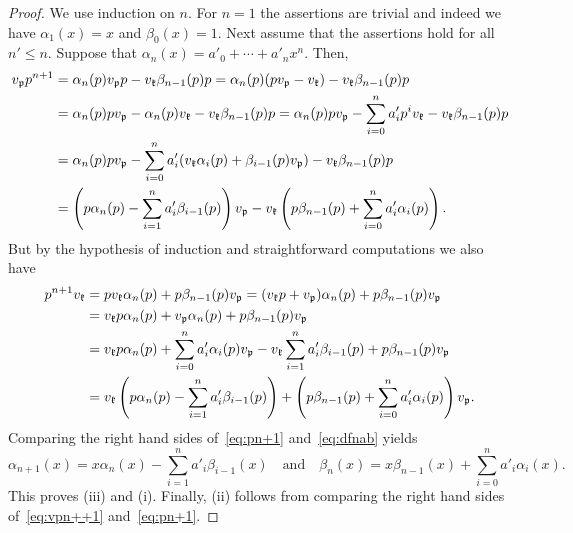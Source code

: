 \documentclass[11pt]{amsart}
\begin{document}
\begin{proof}
We use induction on $n$. For $n=1$ the assertions are  trivial and indeed we have $\alpha_1(x)=x$ and $\beta_0(x)=1$. Next assume that the assertions hold for all $n'\leq n$. Suppose that $\alpha_n(x)=a'_0+\cdots+a'_n x^n$. Then,
\begin{align}
\label{eq:vpn++1}
\notag
v_{\mathfrak p}p^{n+1}
&=
\alpha_{n}(p)v_{\mathfrak p}p-v_{\mathfrak k}\beta_{n-1}(p)p
=
\alpha_{n}(p)(pv_{\mathfrak p}-v_{\mathfrak k})-v_{\mathfrak k}\beta_{n-1}(p)p\\
\notag
&
=\alpha_{n}(p)pv_{\mathfrak p}-\alpha_{n}(p)v_{\mathfrak k}-v_{\mathfrak k}\beta_{n-1}(p)p
=
\alpha_{n}(p)pv_{\mathfrak p}-\sum_{i=0}^{n}a'_ip^i v_{\mathfrak k}-v_{\mathfrak k}\beta_{n-1}(p)p
\\
\notag 
&
=\alpha_{n}(p)pv_{\mathfrak p}-\sum_{i=0}^{n}a'_i(v_{\mathfrak k}\alpha_{i}(p)+\beta_{i-1}(p)v_{\mathfrak p}
)-v_{\mathfrak k}\beta_{n-1}(p)p\\
&=\left(p\alpha_n(p)-\sum_{i=1}^{n}a'_i\beta_{i-1}(p)\right)v_{\mathfrak p}-v_{\mathfrak k}\left(p\beta_{n-1}(p)+\sum_{i=0}^na'_i\alpha_{i}(p)\right).
\end{align}
But by the hypothesis of induction and straightforward computations we also have 
\begin{align}
\label{eq:pn+1}
\notag
p^{n+1}v_{\mathfrak k}
&=
pv_{\mathfrak k}\alpha_{n}(p)+p\beta_{n-1}(p)v_{\mathfrak p}
=
(v_{\mathfrak k}p+v_{\mathfrak p})\alpha_{n}(p)+p\beta_{n-1}(p)v_{\mathfrak p}\\
\notag
&=v_{\mathfrak k}p\alpha_{n}(p)+v_{\mathfrak p}\alpha_{n}(p)+p\beta_{n-1}(p)v_{\mathfrak p}\\
&=v_{\mathfrak k}p\alpha_{n}(p)+\sum_{i=0}^na'_i\alpha_{i}(p)v_{\mathfrak p}-v_{\mathfrak k}\sum_{i=1}^na'_i\beta_{i-1}(p)+p\beta_{n-1}(p)v_{\mathfrak p}\\
&=v_{\mathfrak k}\left(p\alpha_{n}(p)-\sum_{i=1}^na'_i\beta_{i-1}(p)\right)+\left(p\beta_{n-1}(p)+\sum_{i=0}^na'_i\alpha_{i}(p)\right)v_{\mathfrak p}.\notag
\end{align}
Comparing the right hand sides of~\eqref{eq:pn+1} and~\eqref{eq:dfnab} 
yields
\[
\alpha_{n+1}(x) = x\alpha_{n}(x) - \sum_{i=1}^n a'_i \beta_{i-1}(x)
\quad\text{and}\quad
\beta_{n}(x) = x\beta_{n-1}(x) + \sum_{i=0}^n a'_i \alpha_i(x).
\]
This proves (iii) and (i). 
Finally, (ii) follows from comparing the right hand sides of~\eqref{eq:vpn++1} and~\eqref{eq:pn+1}. 
\end{proof}
\end{document}
